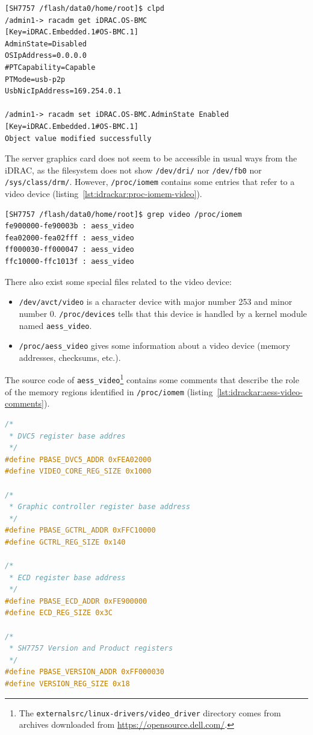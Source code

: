 \begin{lstlisting}[language={},caption={Enabling a network interface from iDRAC's shell.},label={lst:idrackar:pop-net}]
[SH7757 /flash/data0/home/root]$ clpd
/admin1-> racadm get iDRAC.OS-BMC
[Key=iDRAC.Embedded.1#OS-BMC.1]
AdminState=Disabled
OSIpAddress=0.0.0.0
#PTCapability=Capable
PTMode=usb-p2p
UsbNicIpAddress=169.254.0.1

/admin1-> racadm set iDRAC.OS-BMC.AdminState Enabled
[Key=iDRAC.Embedded.1#OS-BMC.1]
Object value modified successfully
\end{lstlisting}

The server graphics card does not seem to be accessible in usual ways from the iDRAC, as the filesystem does not show \texttt{/dev/dri/} nor \texttt{/dev/fb0} nor \texttt{/sys/class/drm/}.
However, \texttt{/proc/iomem} contains some entries that refer to a video device (listing~\ref{lst:idrackar:proc-iomem-video}).

\begin{lstlisting}[language={},caption={Entries related to video in \texttt{/proc/iomem}.},label={lst:idrackar:proc-iomem-video}]
[SH7757 /flash/data0/home/root]$ grep video /proc/iomem
fe900000-fe90003b : aess_video
fea02000-fea02fff : aess_video
ff000030-ff000047 : aess_video
ffc10000-ffc1013f : aess_video
\end{lstlisting}

There also exist some special files related to the video device:
\begin{itemize}
  \item \texttt{/dev/avct/video} is a character device with major number 253 and minor number 0. \texttt{/proc/devices} tells that this device is handled by a kernel module named \texttt{aess\_video}.
  \item \texttt{/proc/aess\_video} gives some information about a video device (memory addresses, checksums, etc.).
\end{itemize}

The source code of \texttt{aess\_video}\footnote{The \texttt{externalsrc/linux-drivers/video\_driver} directory comes from archives downloaded from \url{https://opensource.dell.com/}.} contains some comments that describe the role of the memory regions identified in \texttt{/proc/iomem} (listing~\ref{lst:idrackar:aess-video-comments}).


\begin{lstlisting}[language={C},caption={\texttt{externalsrc/linux-drivers/video\_driver/aess\_video.h}.},label={lst:idrackar:aess-video-comments}]
/*
 * DVC5 register base addres
 */
#define PBASE_DVC5_ADDR 0xFEA02000
#define VIDEO_CORE_REG_SIZE 0x1000

/*
 * Graphic controller register base address
 */
#define PBASE_GCTRL_ADDR 0xFFC10000
#define GCTRL_REG_SIZE 0x140

/*
 * ECD register base address
 */
#define PBASE_ECD_ADDR 0xFE900000
#define ECD_REG_SIZE 0x3C

/*
 * SH7757 Version and Product registers
 */
#define PBASE_VERSION_ADDR 0xFF000030
#define VERSION_REG_SIZE 0x18
\end{lstlisting}

